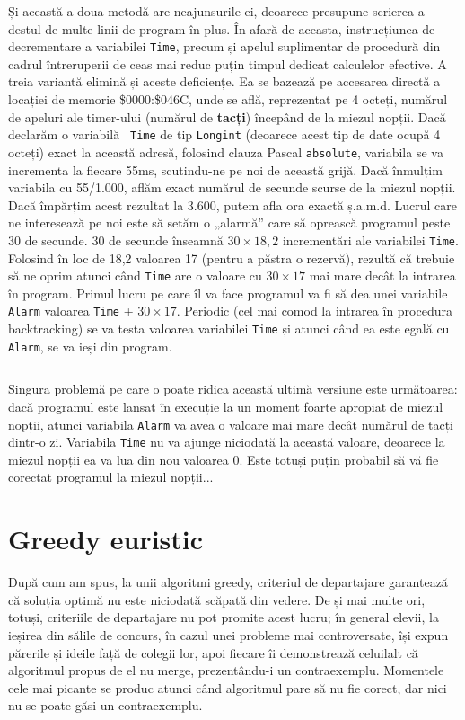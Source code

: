 Și această a doua metodă are neajunsurile ei, deoarece presupune scrierea a
destul de multe linii de program în plus. În afară de aceasta, instrucțiunea
de decrementare a variabilei {\tt Time}, precum și apelul suplimentar de
procedură din cadrul întreruperii de ceas mai reduc puțin timpul dedicat
calculelor efective. A treia variantă elimină și aceste deficiențe. Ea se
bazează pe accesarea directă a locației de memorie \$0000:\$046C, unde se
află, reprezentat pe 4 octeți, numărul de apeluri ale timer-ului (numărul de
{\bf tacți}) începând de la miezul nopții. Dacă declarăm o variabilă {\tt
  Time} de tip {\tt Longint} (deoarece acest tip de date ocupă 4 octeți) exact
la această adresă, folosind clauza Pascal {\tt absolute}, variabila se va
incrementa la fiecare 55ms, scutindu-ne pe noi de această grijă. Dacă înmulțim
variabila cu 55/1.000, aflăm exact numărul de secunde scurse de la miezul
nopții. Dacă împărțim acest rezultat la 3.600, putem afla ora exactă
ș.a.m.d. Lucrul care ne interesează pe noi este să setăm o „alarmă” care să
oprească programul peste 30 de secunde. 30 de secunde înseamnă $30 \times
18,2$ incrementări ale variabilei {\tt Time}. Folosind în loc de 18,2 valoarea
17 (pentru a păstra o rezervă), rezultă că trebuie să ne oprim atunci când
{\tt Time} are o valoare cu $30 \times 17$ mai mare decât la intrarea în
program. Primul lucru pe care îl va face programul va fi să dea unei variabile
{\tt Alarm} valoarea {\tt Time} + $30 \times 17$. Periodic (cel mai comod la
intrarea în procedura backtracking) se va testa valoarea variabilei {\tt Time}
și atunci când ea este egală cu {\tt Alarm}, se va ieși din program.

\inputminted{pascal}{src/chapter5-3.pas}

Singura problemă pe care o poate ridica această ultimă versiune este
următoarea: dacă programul este lansat în execuție la un moment foarte
apropiat de miezul nopții, atunci variabila {\tt Alarm} va avea o valoare mai
mare decât numărul de tacți dintr-o zi. Variabila {\tt Time} nu va ajunge
niciodată la această valoare, deoarece la miezul nopții ea va lua din nou
valoarea 0. Este totuși puțin probabil să vă fie corectat programul la miezul
nopții...

\section{Greedy euristic}

După cum am spus, la unii algoritmi greedy, criteriul de departajare
garantează că soluția optimă nu este niciodată scăpată din vedere. De și mai
multe ori, totuși, criteriile de departajare nu pot promite acest lucru; în
general elevii, la ieșirea din sălile de concurs, în cazul unei probleme mai
controversate, își expun părerile și ideile față de colegii lor, apoi fiecare
îi demonstrează celuilalt că algoritmul propus de el nu merge, prezentându-i
un contraexemplu. Momentele cele mai picante se produc atunci când algoritmul
pare să nu fie corect, dar nici nu se poate găsi un contraexemplu.

